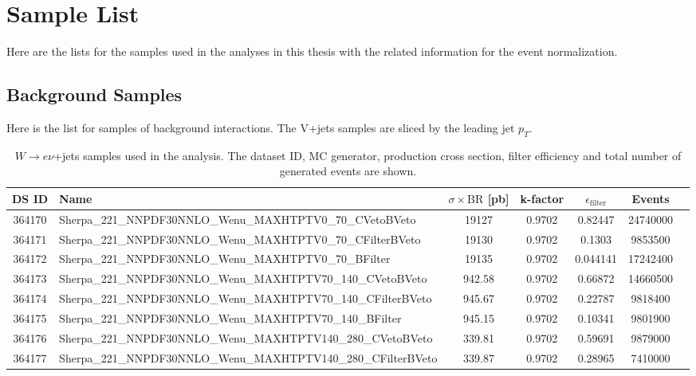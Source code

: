 \chapter{Sample List}
Here are the lists for the samples used in the analyses in this thesis with the related information for the event normalization. 
\section{Background Samples}
Here is the list for samples of background interactions. The V+jets samples are sliced by the leading jet $p_{T}$. 

\begin{landscape}
	
	\begin{table}[p]
		\caption{$W \to e\nu$+jets samples used in the analysis. The dataset ID, MC generator, production cross section, filter efficiency and total number of generated events are shown.}
		\label{tabular:mc_samples_Wenujets}
		\begin{footnotesize}
			\begin{center}
				\begin{tabular}{|c|l|c|c|c|c|r|}
					\hline
					DS ID & Name & $\sigma\times\text{BR}$ [pb] & k-factor & $\epsilon_{\text{filter}}$ & Events \\ \hline
					364170 & Sherpa\_221\_NNPDF30NNLO\_Wenu\_MAXHTPTV0\_70\_CVetoBVeto & 19127 & 0.9702 & 0.82447 & 24740000 \\
					364171 & Sherpa\_221\_NNPDF30NNLO\_Wenu\_MAXHTPTV0\_70\_CFilterBVeto & 19130 & 0.9702 & 0.1303 & 9853500 \\
					364172 & Sherpa\_221\_NNPDF30NNLO\_Wenu\_MAXHTPTV0\_70\_BFilter & 19135 & 0.9702 & 0.044141 & 17242400 \\
					364173 & Sherpa\_221\_NNPDF30NNLO\_Wenu\_MAXHTPTV70\_140\_CVetoBVeto & 942.58 & 0.9702 & 0.66872 & 14660500 \\
					364174 & Sherpa\_221\_NNPDF30NNLO\_Wenu\_MAXHTPTV70\_140\_CFilterBVeto & 945.67 & 0.9702 & 0.22787 & 9818400 \\
					364175 & Sherpa\_221\_NNPDF30NNLO\_Wenu\_MAXHTPTV70\_140\_BFilter & 945.15 & 0.9702 & 0.10341 & 9801900 \\
					364176 & Sherpa\_221\_NNPDF30NNLO\_Wenu\_MAXHTPTV140\_280\_CVetoBVeto & 339.81 & 0.9702 & 0.59691 & 9879000 \\
					364177 & Sherpa\_221\_NNPDF30NNLO\_Wenu\_MAXHTPTV140\_280\_CFilterBVeto & 339.87 & 0.9702 & 0.28965 & 7410000 \\

\end{tabular}
\end{center}
\end{footnotesize}
\end{table}
\end{landscape}
